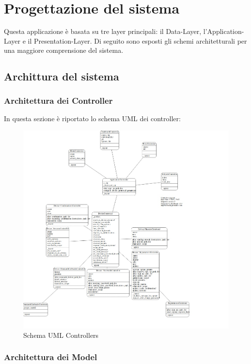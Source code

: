 \documentclass[Lau, binding=0.6cm, oneside]{sapthesis}
\begin{document}
\chapter{Progettazione del sistema}

Questa applicazione è basata su tre layer principali: il Data-Layer, l'Application-Layer e il Presentation-Layer. Di seguito sono esposti gli schemi architetturali per una maggiore comprensione del sistema.

\section{Archittura del sistema}

\subsection{Architettura dei Controller}

In questa sezione è riportato lo schema UML dei controller:\\

\begin{figure}[H]
	\centering
	\includegraphics[width=1\linewidth]{images/controllers_UML} 
	\caption{Schema UML Controllers}
	\label{fig:schema_UML_controllers}
\end{figure}

\subsection{Architettura dei Model}
\end{document}
